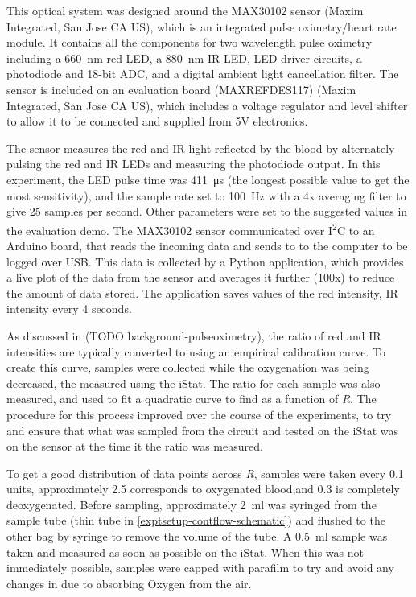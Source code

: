 This optical system was designed around the MAX30102 sensor (Maxim Integrated, San Jose CA US), which is an integrated pulse oximetry/heart rate module.
It contains all the components for two wavelength pulse oximetry including a \SI{660}{nm} red LED, a \SI{880}{nm} IR LED, LED driver circuits, a photodiode and 18-bit ADC, and a digital ambient light cancellation filter.
The sensor is included on an evaluation board (MAXREFDES117) (Maxim Integrated, San Jose CA US), which includes a voltage regulator and level shifter to allow it to be connected and supplied from 5V electronics.

The sensor measures the red and IR light reflected by the blood by alternately pulsing the red and IR LEDs and measuring the photodiode output.
In this experiment, the LED pulse time was \SI{411}{\micro\second} (the longest possible value to get the most sensitivity), and the sample rate set to \SI{100}{Hz} with a 4x averaging filter to give 25 samples per second.
Other parameters were set to the suggested values in the evaluation demo.
The MAX30102 sensor communicated over I\textsuperscript{2}C to an Arduino board, that reads the incoming data and sends to to the computer to be logged over USB.
This data is collected by a Python application, which provides a live plot of the data from the sensor and averages it further (100x) to reduce the amount of data stored.
The application saves values of the red intensity, IR intensity every 4 seconds.

As discussed in (TODO background-pulseoximetry), the ratio of red and IR intensities are typically converted to \SOtwo using an empirical calibration curve.
To create this curve, samples were collected while the oxygenation was being decreased, the \SOtwos measured using the iStat.
The ratio for each sample was also measured, and used to fit a quadratic curve to find \SOtwo as a function of \textit{R}.
The procedure for this process improved over the course of the experiments, to try and ensure that what was sampled from the circuit and tested on the iStat was on the sensor at the time it the ratio was measured.

To get a good distribution of data points across \textit{R}, samples were taken every 0.1 units, approximately 2.5 corresponds to oxygenated blood,and 0.3 is completely deoxygenated.
Before sampling, approximately \SI{2}{ml} was syringed from the sample tube (thin tube in \autoref{exptsetup-contflow-schematic}) and flushed to the other bag by syringe to remove the volume of the tube.
A \SI{0.5}{ml} sample was taken and measured as soon as possible on the iStat.
When this was not immediately possible, samples were capped with parafilm to try and avoid any changes in \SOtwo due to absorbing Oxygen from the air.
